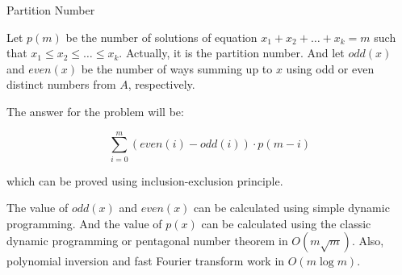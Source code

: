 \begin{tutorial}{Partition Number}

Let $p(m)$ be the number of solutions of equation $x_1+x_2+\ldots+x_k=m$ such that $x_1 \le x_2 \le \ldots \le x_k$. Actually, it is the partition number. And let $\mathit{odd}(x)$ and $\mathit{even}(x)$ be the number of ways summing up to $x$ using odd or even distinct numbers from $A$, respectively.

The answer for the problem will be:

$$
\sum_{i=0}^{m} (\mathit{even}(i) - \mathit{odd}(i)) \cdot p(m-i)
$$

which can be proved using inclusion-exclusion principle.

The value of $\mathit{odd}(x)$ and $\mathit{even}(x)$ can be calculated using simple dynamic programming. And the value of $p(x)$ can be calculated using the classic dynamic programming or pentagonal number theorem in $O(m \sqrt m)$. Also, polynomial inversion and fast Fourier transform work in $O(m \log m)$.

\end{tutorial}
